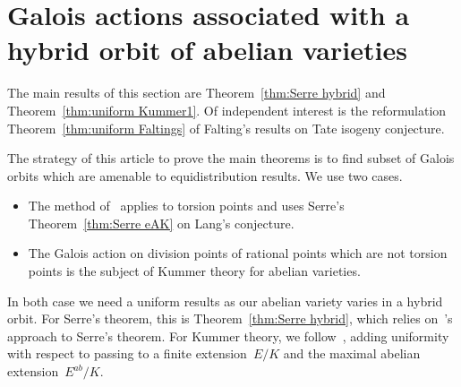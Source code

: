 \documentclass[12pt]{amsart}
\newtheorem{proposition}[theorem]{Proposition}
\newtheorem{lemma}[theorem]{Lemma}
\newcommand{\C}{{\mathbb C}}
\newcommand{\ol}{\overline}
\begin{document}
%
%
%
%


\section{Galois actions associated with a hybrid orbit of abelian varieties}\label{sec:Galois}
The main results of this section are Theorem~\ref{thm:Serre hybrid} and Theorem~\ref{thm:uniform Kummer1}.
Of independent interest is the reformulation Theorem~\ref{thm:uniform Faltings} of Falting's results
on Tate isogeny conjecture.

The strategy of this article to prove the main theorems is to find subset of Galois
orbits which are amenable to equidistribution results. We use two cases.
\begin{itemize}
\item The method of~\cite{RWeyl} applies to torsion points and uses Serre's Theorem~\ref{thm:Serre eAK}
on Lang's conjecture. 
\item The Galois action on division points of rational points which are not torsion points is the subject of Kummer theory for abelian varieties.
\end{itemize}
In both case we need a uniform results as our abelian variety varies in a hybrid orbit.
For Serre's theorem, this is Theorem~\ref{thm:Serre hybrid}, which relies on~\cite[App. B]{RY:IHES}'s approach to Serre's theorem. For Kummer theory, we follow~\cite{Hindry}, adding uniformity with respect to passing to a finite extension~$E/K$
and the maximal abelian extension~$E^{ab}/K$.
\end{document}

